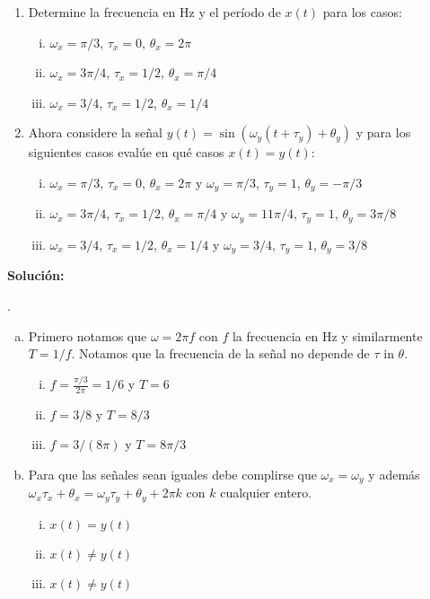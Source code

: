 \documentclass[letterpaper, 12pt]{article}
\newif\ifanswers
\begin{document}
\begin{enumerate}
    \begin{enumerate}
        \item Determine la frecuencia en Hz y el período de $x(t)$ para los casos:
        \begin{enumerate}[i)]
            \item $\omega_x = \pi/3$, $\tau_x = 0$, $\theta_x = 2\pi$
            \item $\omega_x = 3\pi/4$, $\tau_x = 1/2$, $\theta_x = \pi/4$
            \item $\omega_x = 3/4$, $\tau_x = 1/2$, $\theta_x = 1/4$
        \end{enumerate}
    \item Ahora considere la señal $y(t) = \sin{(\omega_y(t+\tau_y)+\theta_y)}$ y para los siguientes casos evalúe en qué casos $x(t) = y(t)$:
    \begin{enumerate}[i)]
        \item $\omega_x = \pi/3$, $\tau_x = 0$, $\theta_x = 2\pi$ y $\omega_y = \pi/3$, $\tau_y = 1$, $\theta_y = -\pi/3$
    
        \item $\omega_x = 3\pi/4$, $\tau_x = 1/2$, $\theta_x = \pi/4$ y $\omega_y = 11\pi/4$, $\tau_y = 1$, $\theta_y = 3\pi/8$
    
        \item $\omega_x = 3/4$, $\tau_x = 1/2$, $\theta_x = 1/4$ y $\omega_y = 3/4$, $\tau_y = 1$, $\theta_y = 3/8$
    \end{enumerate}
    \end{enumerate}
        \ifanswers
       {\color{red} \textbf{Solución:}
       
    .
       \begin{enumerate}[a)]
           \item    Primero notamos que $\omega = 2\pi f$ con $f$ la frecuencia en Hz y similarmente $T = 1/f$. Notamos que la frecuencia de la señal no depende de $\tau$ in $\theta$.
           \begin{enumerate}[i)]
               \item $f = \frac{\pi/3}{2\pi} = 1/6 $ y $ T = 6$
               \item $f = 3/8$ y $T = 8/3$
               \item $f = 3/(8\pi)$ y $T = 8 \pi/3 $
           \end{enumerate}
           
        \item Para que las señales sean iguales debe complirse que $\omega_x = \omega_y$ y además $\omega_x \tau_x +\theta_x = \omega_y \tau_y + \theta_y + 2\pi k$ con $k$ cualquier entero.
        \begin{enumerate}[i)]
            \item $x(t) = y(t)$
            \item $x(t) \neq y(t)$
            \item $x(t) \neq y(t)$
        \end{enumerate}
       \end{enumerate}
    
}
\end{enumerate}
\end{document}
